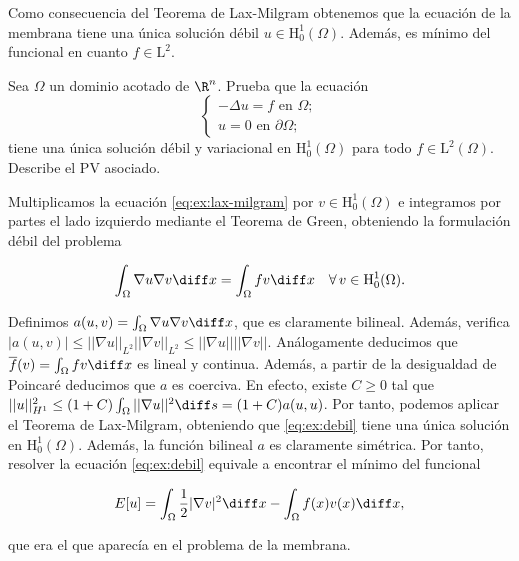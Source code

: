 \documentclass{article}
\begin{document}
Como consecuencia del Teorema de Lax-Milgram obtenemos que la ecuación de la membrana tiene una
única solución débil $u \in \mathrm{H}_0^1(\Omega)$. Además, es mínimo del funcional en cuanto
$f \in \mathrm{L}^2$.

\begin{ex}
  Sea $\Omega$ un dominio acotado de $\R^n$. Prueba que la ecuación
  \begin{equation}
    \label{eq:ex:lax-milgram}
    \begin{cases}
      -\Delta u = f \text{ en } \Omega; \\
      u = 0 \text{ en } \partial \Omega;
    \end{cases}
  \end{equation}
  tiene una única solución débil y variacional en $\mathrm{H}_0^1(\Omega)$ para todo
  $f \in \mathrm{L}^2(\Omega)$. Describe el PV asociado.

  Multiplicamos la ecuación \eqref{eq:ex:lax-milgram} por $v \in \mathrm{H}_0^1(\Omega)$ e
  integramos por partes el lado izquierdo mediante el Teorema de Green, obteniendo la formulación
  débil del problema

  \begin{equation}
    \label{eq:ex:debil}
    \int_{\Omega} \nabla u \nabla v \diff x = \int_{\Omega} f v \diff x \quad \forall \, v \in \mathrm{H}_0^1(\Omega).
  \end{equation}

  Definimos $a(u,v) = \int_{\Omega} \nabla u \nabla v \diff x$, que es claramente bilineal. Además,
  verifica $|a(u,v)| \le ||\nabla u||_{L^2} ||\nabla v||_{L^2} \le ||\nabla u|| ||\nabla
  v||$. Análogamente deducimos que $\overline{f}(v) = \int_{\Omega} f v \diff x$ es lineal y
  continua. Además, a partir de la desigualdad de Poincaré deducimos que $a$ es coerciva. En efecto,
  existe $C \ge 0$ tal que
  $||u||^2_{H^1} \le (1+C) \int_{\Omega} ||\nabla u||^2 \diff s = (1+C) a(u,u)$. Por tanto, podemos
  aplicar el Teorema de Lax-Milgram, obteniendo que \eqref{eq:ex:debil} tiene una única solución en
  $\mathrm{H}_0^1(\Omega)$. Además, la función bilineal $a$ es claramente simétrica. Por tanto,
  resolver la ecuación \eqref{eq:ex:debil} equivale a encontrar el mínimo del funcional
  
  \begin{equation*}
    E[u] = \int_{\Omega} \frac{1}{2}|\nabla v|^2 \diff x -\int_{\Omega}
    f(x) v(x) \diff x,
  \end{equation*}

  que era el que aparecía en el problema de la membrana.
  
\end{ex}
\end{document}
